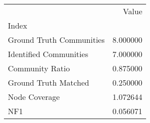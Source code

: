 \begin{tabular}{lr}
\toprule
{} &     Value \\
Index                    &           \\
\midrule
Ground Truth Communities &  8.000000 \\
Identified Communities   &  7.000000 \\
Community Ratio          &  0.875000 \\
Ground Truth Matched     &  0.250000 \\
Node Coverage            &  1.072644 \\
NF1                      &  0.056071 \\
\bottomrule
\end{tabular}
